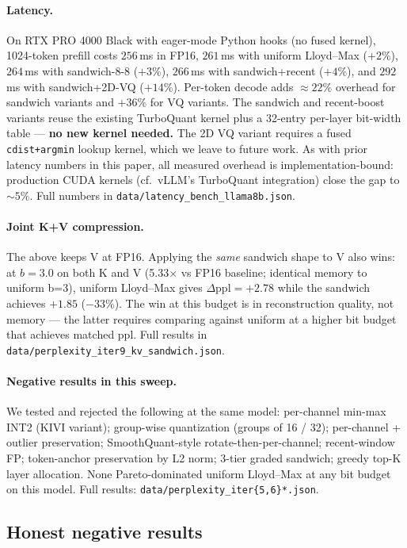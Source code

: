 \documentclass[11pt]{article}
\theoremstyle{definition}
\begin{document}
\paragraph{Latency.} On RTX PRO 4000 Black with eager-mode Python hooks
(no fused kernel), 1024-token prefill costs $256$\,ms in FP16, $261$\,ms with
uniform Lloyd--Max ($+2\%$), $264$\,ms with sandwich-8-8 ($+3\%$), $266$\,ms
with sandwich+recent ($+4\%$), and $292$\,ms with sandwich+2D-VQ ($+14\%$).
Per-token decode adds $\approx 22\%$ overhead for sandwich variants and
$+36\%$ for VQ variants. The sandwich and recent-boost variants reuse
the existing TurboQuant kernel plus a 32-entry per-layer bit-width table ---
\textbf{no new kernel needed.} The 2D VQ variant requires a fused
\texttt{cdist+argmin} lookup kernel, which we leave to future work. As with
prior latency numbers in this paper, all measured overhead is
implementation-bound: production CUDA kernels (cf.\ vLLM's TurboQuant
integration) close the gap to $\sim 5\%$. Full numbers in
\texttt{data/latency\_bench\_llama8b.json}.

\paragraph{Joint K+V compression.} The above keeps V at FP16. Applying the
\emph{same} sandwich shape to V also wins: at $b{=}3.0$ on both K and V
(5.33$\times$ vs FP16 baseline; identical memory to uniform b=3), uniform
Lloyd--Max gives $\Delta\text{ppl} = +2.78$ while the sandwich achieves
$+1.85$ ($-33\%$). The win at this budget is in reconstruction quality, not
memory --- the latter requires comparing against uniform at a higher bit budget
that achieves matched ppl. Full results in
\texttt{data/perplexity\_iter9\_kv\_sandwich.json}.

\paragraph{Negative results in this sweep.} We tested and rejected the
following at the same model: per-channel min-max INT2 (KIVI variant); group-wise
quantization (groups of 16 / 32); per-channel + outlier preservation;
SmoothQuant-style rotate-then-per-channel; recent-window FP; token-anchor
preservation by L2 norm; 3-tier graded sandwich; greedy top-K layer
allocation. None Pareto-dominated uniform Lloyd--Max at any bit budget on
this model. Full results: \texttt{data/perplexity\_iter\{5,6\}*.json}.

\subsection{Honest negative results}
\end{document}
